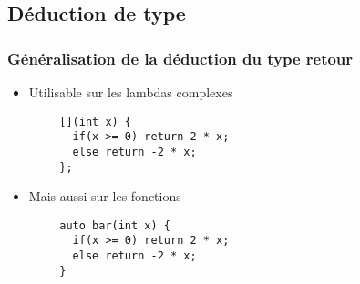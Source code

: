 \documentclass[C++.tex]{subfiles}
\begin{document}
\subsection*{Déduction de type}
\begin{frame}[fragile]
	\frametitle{Généralisation de la déduction du type retour}
	\begin{itemize}
		\item Utilisable sur les lambdas complexes
	\end{itemize}

	\begin{verbatim}
		[](int x) { 
		  if(x >= 0) return 2 * x; 
		  else return -2 * x;
		};
	\end{verbatim}

	\begin{itemize}
		\item Mais aussi sur les fonctions
	\end{itemize}

	\begin{verbatim}
		auto bar(int x) {
		  if(x >= 0) return 2 * x; 
		  else return -2 * x;
		}
	\end{verbatim}
\end{frame}
\end{document}
